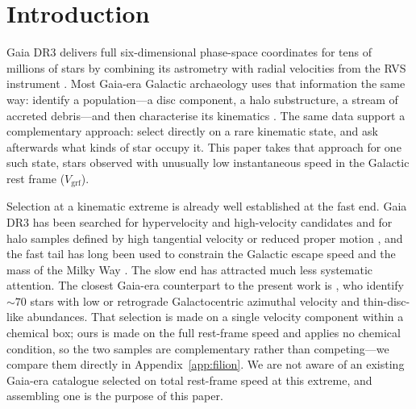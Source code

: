 \documentclass{aa}  %
\newcommand{\vgrf}{\ensuremath{V_{\mathrm{grf}}}\xspace}
\begin{document}

\maketitle


\section{Introduction} \label{sec:intro}

Gaia DR3 delivers full six-dimensional phase-space coordinates for tens
of millions of stars by combining its astrometry with radial velocities
from the RVS instrument \citep{Vallenari2023,Katz2023}.  Most Gaia-era
Galactic archaeology uses that information the same way: identify a
population---a disc component, a halo substructure, a stream of accreted
debris---and then characterise its kinematics
\citep[see][for reviews]{BinneyMerrifield1998,BlandHawthorn2016,
Helmi2020,Deason2024}.  The same data support a complementary approach:
select directly on a rare kinematic state, and ask afterwards what kinds
of star occupy it.  This paper takes that approach for one such state,
stars observed with unusually low instantaneous speed in the Galactic
rest frame (\vgrf).

Selection at a kinematic extreme is already well established at the fast
end.  Gaia DR3 has been searched for hypervelocity and high-velocity
candidates \citep{Marchetti2022,CarballoBello2025} and for halo samples
defined by high tangential velocity or reduced proper motion
\citep{Viswanathan2023}, and the fast tail has long been used to
constrain the Galactic escape speed and the mass of the Milky Way
\citep{Smith2007,Piffl2014,KoppelmanHelmi2021}.  The slow end has
attracted much less systematic attention.  The closest Gaia-era
counterpart to the present work is \citet{Filion2025}, who identify
$\sim 70$ stars with low or retrograde Galactocentric azimuthal velocity
and thin-disc-like abundances.  That selection is made on a single
velocity component within a chemical box; ours is made on the full
rest-frame speed and applies no chemical condition, so the two samples
are complementary rather than competing---we compare them directly in
Appendix~\ref{app:filion}.  We are not aware of an existing Gaia-era
catalogue selected on total rest-frame speed at this extreme, and
assembling one is the purpose of this paper.
\end{document}
